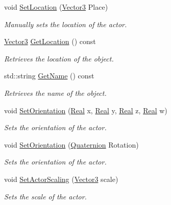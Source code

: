 \begin{DoxyCompactItemize}
void \hyperlink{classphys_1_1ActorBase_a3212be459859a67bf7ae64919d58d5a5}{SetLocation} (\hyperlink{classphys_1_1Vector3}{Vector3} Place)
\begin{DoxyCompactList}\small\item\em Manually sets the location of the actor. \item\end{DoxyCompactList}\item 
\hyperlink{classphys_1_1Vector3}{Vector3} \hyperlink{classphys_1_1ActorBase_a777b4ea4d6881af76c646b1ba9324d96}{GetLocation} () const 
\begin{DoxyCompactList}\small\item\em Retrieves the location of the object. \item\end{DoxyCompactList}\item 
std::string \hyperlink{classphys_1_1ActorBase_afc1851d7445c98a9389b3902a214a5e1}{GetName} () const 
\begin{DoxyCompactList}\small\item\em Retrieves the name of the object. \item\end{DoxyCompactList}\item 
void \hyperlink{classphys_1_1ActorBase_adbf0cc77031f22597a799fd0f7f8216d}{SetOrientation} (\hyperlink{namespacephys_af7eb897198d265b8e868f45240230d5f}{Real} x, \hyperlink{namespacephys_af7eb897198d265b8e868f45240230d5f}{Real} y, \hyperlink{namespacephys_af7eb897198d265b8e868f45240230d5f}{Real} z, \hyperlink{namespacephys_af7eb897198d265b8e868f45240230d5f}{Real} w)
\begin{DoxyCompactList}\small\item\em Sets the orientation of the actor. \item\end{DoxyCompactList}\item 
void \hyperlink{classphys_1_1ActorBase_ac4b0bf1eff730d94f72d04957efea69d}{SetOrientation} (\hyperlink{classphys_1_1Quaternion}{Quaternion} Rotation)
\begin{DoxyCompactList}\small\item\em Sets the orientation of the actor. \item\end{DoxyCompactList}\item 
void \hyperlink{classphys_1_1ActorBase_a1ac7c692d7f88f39ebb1c1db5deba251}{SetActorScaling} (\hyperlink{classphys_1_1Vector3}{Vector3} scale)
\begin{DoxyCompactList}\small\item\em Sets the scale of the actor. \item\end{DoxyCompactList}\item 

\end{DoxyCompactItemize}
